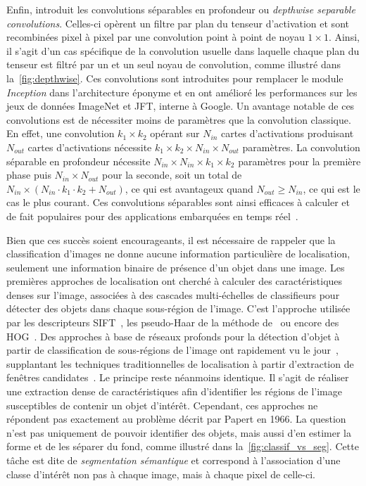 Enfin, \citet{chollet_xception_2017} introduit les convolutions séparables en profondeur ou \emph{depthwise separable convolutions}. Celles-ci opèrent un filtre par plan du tenseur d'activation et sont recombinées pixel à pixel par une convolution point à point de noyau $1\times1$. Ainsi, il s'agit d'un cas spécifique de la convolution usuelle dans laquelle chaque plan du tenseur est filtré par un et un seul noyau de convolution, comme illustré dans la~\cref{fig:depthwise}. Ces convolutions sont introduites pour remplacer le module \emph{Inception} dans l'architecture éponyme et en ont amélioré les performances sur les jeux de données ImageNet et JFT, interne à Google. Un avantage notable de ces convolutions est de nécessiter moins de paramètres que la convolution classique. En effet, une convolution $k_1 \times k_2$ opérant sur $N_{in}$ cartes d'activations produisant $N_{out}$ cartes d'activations nécessite $k_1 \times k_2 \times N_{in} \times N_{out}$ paramètres. La convolution séparable en profondeur nécessite $N_{in} \times N_{in} \times k_1 \times k_2$ paramètres pour la première phase puis $N_{in} \times N_{out}$ pour la seconde, soit un total de $N_{in} \times (N_{in} \cdot k_1 \cdot k_2 + N_{out})$, ce qui est avantageux quand $N_{out} \ge N_{in}$, ce qui est le cas le plus courant. Ces convolutions séparables sont ainsi efficaces à calculer et de fait populaires pour des applications embarquées en temps réel~\cite{howard_mobilenets_2017}.

Bien que ces succès soient encourageants, il est nécessaire de rappeler que la classification d'images ne donne aucune information particulière de localisation, seulement une information binaire de présence d'un objet dans une image. Les premières approches de localisation ont cherché à calculer des caractéristiques denses sur l'image, associées à des cascades multi-échelles de classifieurs pour détecter des objets dans chaque sous-région de l'image. C'est l'approche utilisée par les descripteurs \gls{SIFT}~\cite{lowe_object_1999}, les pseudo-Haar de la méthode de~\citet{viola_robust_2001} ou encore des \gls{HOG}~\cite{dalal_histograms_2005}. Des approches à base de réseaux profonds pour la détection d'objet à partir de classification de sous-régions de l'image ont rapidement vu le jour~\cite{girshick_rich_2014,liu_ssd_2016,girshick_region-based_2016}, supplantant les techniques traditionnelles de localisation à partir d'extraction de fenêtres candidates~\cite{gu_recognition_2009,uijlings_selective_2013}. Le principe reste néanmoins identique. Il s'agit de réaliser une extraction dense de caractéristiques afin d'identifier les régions de l'image susceptibles de contenir un objet d'intérêt. Cependant, ces approches ne répondent pas exactement au problème décrit par Papert en 1966. La question n'est pas uniquement de pouvoir identifier des objets, mais aussi d'en estimer la forme et de les séparer du fond, comme illustré dans la~\cref{fig:classif_vs_seg}. Cette tâche est dite de \emph{segmentation sémantique} et correspond à l'association d'une classe d'intérêt non pas à chaque image, mais à chaque pixel de celle-ci.

